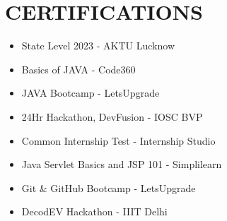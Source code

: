 \documentclass[letterpaper,11pt]{article}
\newcommand{\resumeItem}[1]{
  \item\small{
    {#1 \vspace{-2pt}}
  }
}
\newcommand{\resumeSubHeadingListStart}{\begin{itemize}[leftmargin=0.0in, label={}]}
\newcommand{\resumeSubHeadingListEnd}{\end{itemize}}
\begin{document}
\section{CERTIFICATIONS}
        \begin{multicols}{2}
            \begin{itemize}[itemsep=-2pt, parsep=5pt]
            
                \resumeItem{\normalsize{State Level 2023 - AKTU Lucknow \href{https://drive.google.com/file/d/1YHd_APmmRxci39WWuv1VKCRZwYktbc46/view?usp=sharing}{\raisebox{-0.1\height}\faExternalLink }}}
                
                \resumeItem{\normalsize{Basics of JAVA - Code360 \href{https://drive.google.com/file/d/1Nm014uqYNsb_XncsCdlcDKqDkg1dVOGi/view?usp=sharing}{\raisebox{-0.1\height}\faExternalLink }}}

                \resumeItem{\normalsize{JAVA Bootcamp - LetsUpgrade \href{https://drive.google.com/file/d/1JiCn86cqrr71JZqjwhMyjC53SA7VogSJ/view?usp=sharing}{\raisebox{-0.1\height}\faExternalLink }}}

                \resumeItem{\normalsize{24Hr Hackathon, DevFusion - IOSC BVP \href{https://drive.google.com/file/d/1Y046aysVbb1MtPwIMTzt-OPDbbOyxPuO/view}{\raisebox{-0.1\height}\faExternalLink }}}
                
                \resumeItem{\normalsize{Common Internship Test - Internship Studio \href{https://drive.google.com/file/d/1G_paa_wuahkm9g1B6w4lyEHCSUyZV7oN/view?usp=sharing}{\raisebox{-0.1\height}\faExternalLink }}}
                
                \resumeItem{\normalsize{Java Servlet Basics and JSP 101 - Simplilearn \href{https://drive.google.com/file/d/1Fd9keyvOuHhNWuEnyytL30QDHWYlUQ6K/view?usp=sharing}{\raisebox{-0.1\height}\faExternalLink }}} 

                \resumeItem{\normalsize{Git \& GitHub Bootcamp - LetsUpgrade \href{https://drive.google.com/file/d/1Jh2g6Wi9d1bNxF9mwZm3wZ2zQX4tE5rs/view?usp=sharing}{\raisebox{-0.1\height}\faExternalLink }}} 

                \resumeItem{\normalsize{DecodEV Hackathon - IIIT Delhi \href{https://drive.google.com/file/d/1fCNtmXoVUAb0ODNFukv-5NFMe34_Kcgm/view?usp=sharing}{\raisebox{-0.1\height}\faExternalLink }}} 
                 
            \end{itemize}
        \end{multicols}
        \vspace*{2.0\multicolsep}
\end{document}
